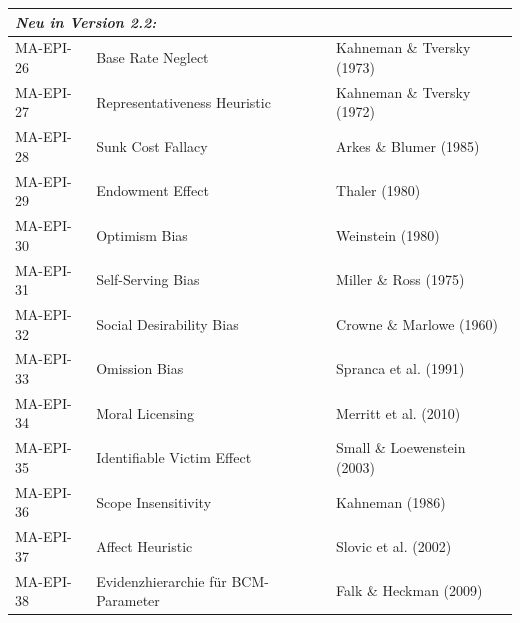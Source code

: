 \begin{longtable}{@{}lll@{}}
\midrule
\multicolumn{3}{l}{\textit{Neu in Version 2.2:}} \\
\midrule
MA-EPI-26 & Base Rate Neglect & Kahneman \& Tversky (1973) \\
MA-EPI-27 & Representativeness Heuristic & Kahneman \& Tversky (1972) \\
MA-EPI-28 & Sunk Cost Fallacy & Arkes \& Blumer (1985) \\
MA-EPI-29 & Endowment Effect & Thaler (1980) \\
MA-EPI-30 & Optimism Bias & Weinstein (1980) \\
MA-EPI-31 & Self-Serving Bias & Miller \& Ross (1975) \\
MA-EPI-32 & Social Desirability Bias & Crowne \& Marlowe (1960) \\
MA-EPI-33 & Omission Bias & Spranca et al. (1991) \\
MA-EPI-34 & Moral Licensing & Merritt et al. (2010) \\
MA-EPI-35 & Identifiable Victim Effect & Small \& Loewenstein (2003) \\
MA-EPI-36 & Scope Insensitivity & Kahneman (1986) \\
MA-EPI-37 & Affect Heuristic & Slovic et al. (2002) \\
MA-EPI-38 & Evidenzhierarchie für BCM-Parameter & Falk \& Heckman (2009) \\
\end{longtable}

